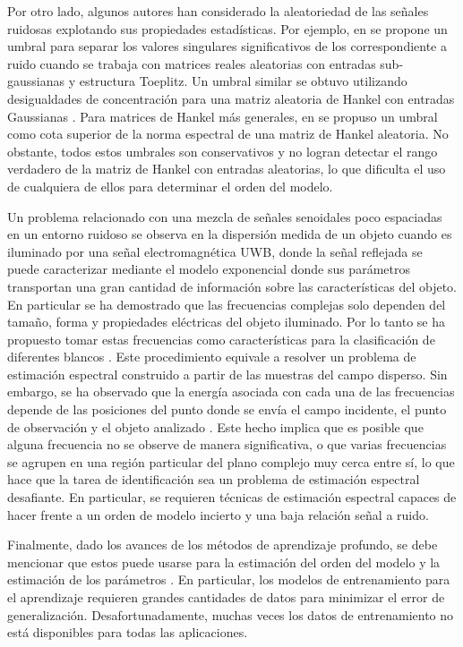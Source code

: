 Por otro lado, algunos autores han considerado la aleatoriedad de las señales ruidosas explotando sus propiedades estadísticas. Por ejemplo, en \cite{Qiao2020} se propone un umbral para separar los valores singulares significativos de los correspondiente a ruido cuando se trabaja con matrices reales aleatorias con entradas sub-gaussianas y estructura Toeplitz. Un umbral similar se obtuvo utilizando desigualdades de concentración para una matriz aleatoria de Hankel con entradas Gaussianas \cite{tropp2015}. Para matrices de Hankel más generales, en \cite{Hokanson2020} se propuso un umbral como cota superior de la norma espectral de una matriz de Hankel aleatoria. No obstante, todos estos umbrales son conservativos y no logran detectar el rango verdadero de la matriz de Hankel con entradas aleatorias, lo que dificulta el uso de cualquiera de ellos para determinar el orden del modelo. 

Un problema relacionado con una mezcla de señales senoidales poco espaciadas en un entorno ruidoso se observa en la dispersión medida de un objeto cuando es iluminado por una señal electromagnética UWB, donde la señal reflejada se puede caracterizar mediante el modelo exponencial \cite{Baum1971} donde sus parámetros transportan una gran cantidad de información sobre las características del objeto. En particular se ha demostrado que las frecuencias complejas solo dependen del tamaño, forma y propiedades eléctricas del objeto iluminado. Por lo tanto se ha propuesto tomar estas frecuencias como características para la clasificación de diferentes blancos \cite{Knochel2005, Bannis2014, LAUNAY2013, Altieri2020}.  Este procedimiento equivale a resolver un problema de estimación espectral construido a partir de las muestras del campo disperso. Sin embargo, se ha observado que la energía asociada con cada una de las frecuencias depende de las posiciones del punto donde se envía el campo incidente, el punto de observación y el objeto analizado \cite{Baum1976}. Este hecho implica que es posible que alguna frecuencia no se observe de manera significativa, o que varias frecuencias se agrupen en una región particular del plano complejo muy cerca entre sí, lo que hace que la tarea de identificación sea un problema de estimación espectral desafiante. En particular, se requieren técnicas de estimación espectral capaces de hacer frente a un orden de modelo incierto y una baja relación señal a ruido. 

Finalmente, dado los avances de los métodos de aprendizaje profundo, se debe mencionar que estos puede usarse para la estimación del orden del modelo \cite{Moon2021} y la estimación de los parámetros \cite{Mhaska2020}. En particular, los modelos de entrenamiento para el aprendizaje requieren grandes cantidades de datos para minimizar el error de generalización. Desafortunadamente, muchas veces los datos de entrenamiento no está disponibles para todas las aplicaciones.

